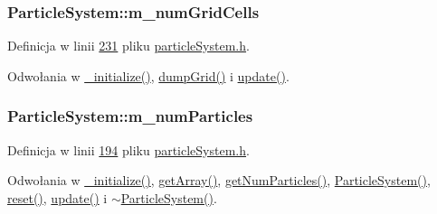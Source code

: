 \hypertarget{class_particle_system_aa1ef17d723af5d7a4685e8fd57e9ca89}{
\subsubsection[{m\-\_\-num\-Grid\-Cells}]{ Particle\-System\-::m\-\_\-num\-Grid\-Cells\hspace{0.3cm}{\ttfamily [protected]}}}\label{class_particle_system_aa1ef17d723af5d7a4685e8fd57e9ca89}


Definicja w linii \hyperlink{particle_system_8h_source_l00231}{231} pliku \hyperlink{particle_system_8h_source}{particle\-System.\-h}.



Odwołania w \hyperlink{particle_system_8cpp_source_l00142}{\-\_\-initialize()}, \hyperlink{particle_system_8cpp_source_l00335}{dump\-Grid()} i \hyperlink{particle_system_8cpp_source_l00266}{update()}.

\hypertarget{class_particle_system_a23d238efa80a647d4b6cde034f486a91}{
\subsubsection[{m\-\_\-num\-Particles}]{ Particle\-System\-::m\-\_\-num\-Particles\hspace{0.3cm}{\ttfamily [protected]}}}\label{class_particle_system_a23d238efa80a647d4b6cde034f486a91}


Definicja w linii \hyperlink{particle_system_8h_source_l00194}{194} pliku \hyperlink{particle_system_8h_source}{particle\-System.\-h}.



Odwołania w \hyperlink{particle_system_8cpp_source_l00142}{\-\_\-initialize()}, \hyperlink{particle_system_8cpp_source_l00375}{get\-Array()}, \hyperlink{particle_system_8h_source_l00052}{get\-Num\-Particles()}, \hyperlink{particle_system_8cpp_source_l00040}{Particle\-System()}, \hyperlink{particle_system_8cpp_source_l00465}{reset()}, \hyperlink{particle_system_8cpp_source_l00266}{update()} i \hyperlink{particle_system_8cpp_source_l00097}{$\sim$\-Particle\-System()}.

